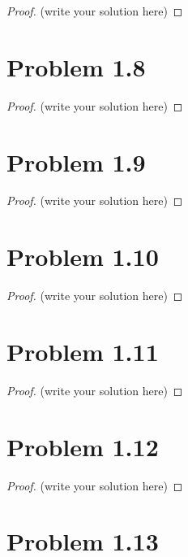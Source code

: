 \documentclass[12pt]{article}
\begin{document}
\begin{proof}
	(write your solution here)
\end{proof}

\newpage 

\section{Problem 1.8}

\begin{proof}
	(write your solution here)
\end{proof}

\newpage 

\section{Problem 1.9}

\begin{proof}
	(write your solution here)
\end{proof}

\newpage 

\section{Problem 1.10}

\begin{proof}
	(write your solution here)
\end{proof}

\newpage 

\section{Problem 1.11}

\begin{proof}
	(write your solution here)
\end{proof}

\newpage 

\section{Problem 1.12}

\begin{proof}
	(write your solution here)
\end{proof}

\newpage 

\section{Problem 1.13}
\end{document}
